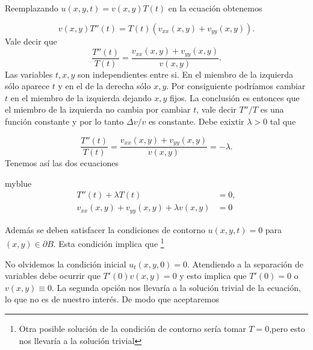 Reemplazando $u(x,y,t)=v(x,y)T(t)$ en la ecuación obtenemos

\begin{equation}\label{eq:sep_var}v(x,y)T''(t)=T(t)\left(v_{xx}(x,y)+v_{yy}(x,y) \right).
\end{equation}
Vale decir que
\[\frac{T''(t)}{T(t) }=\frac{v_{xx}(x,y)+v_{yy}(x,y)}{v(x,y)}.\]
Las variables $t,x,y$ son independientes entre si.  En el miembro de la izquierda sólo aparece $t$ y en el de la derecha sólo $x,y$.  Por consiguiente  podríamos cambiar $t$ en el miembro de la izquierda dejando $x,y$ fijos. La conclusión es entonces que el miembro de la izquierda no cambia por cambiar $t$, vale decir $T''/T$ es una función constante y por lo tanto $\Delta v/v$ es constante. Debe exixtir $\lambda>0$ tal que
 
 \[\frac{T''(t)}{T(t) }=\frac{v_{xx}(x,y)+v_{yy}(x,y)}{v(x,y)}=-\lambda.\]
Tenemos así las dos ecuaciones
\begin{colbox}{myblue}{
\begin{align}
  T''(t)+\lambda T(t)&=0,\label{eq:eq_t}\\
  v_{xx}(x,y)+v_{yy}(x,y)+\lambda v(x,y)&=0\label{eq:eq_xy}
\end{align}
}
\end{colbox}

Además se deben satisfacer la condiciones de contorno  $u(x,y,t)=0$ para  $(x,y)\in \partial B$. Esta condición implica que \footnote{Otra posible solución de la condición de contorno sería tomar  $T=0$,pero esto  nos llevaría a la solución trivial}

No olvidemos  la condición inicial $u_t(x,y,0)=0$. Atendiendo a la separación de variables debe ocurrir que $T'(0)v(x,y)=0$ y esto implica que  $T'(0)=0$ o $v(x,y)\equiv 0$. La segunda opción nos llevaría a  la solución trivial de la ecuación, lo que no es de nuestro interés. De modo que aceptaremos


